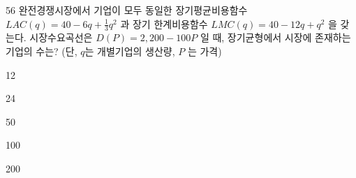 \begin{question}{56}
완전경쟁시장에서 기업이 모두 동일한 장기평균비용함수 $LAC(q)=40-6q+\frac{1}{3}q^{2}$ 과 장기
한계비용함수 $LMC(q)=40-12q+q^{2}$ 을 갖는다. 시장수요곡선은 $D(P)=2,200-100P$ 일 때, 장기균형에서 시장에 존재하는 기업의 수는? (단, $q$는 개별기업의 생산량, $P$ 는 가격) \par
\begin{choices}
  \item 12
  \item 24
  \item 50
  \item 100
  \item 200
\end{choices}
\end{question}
